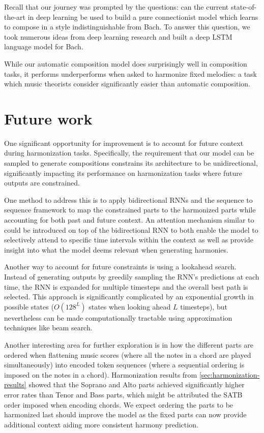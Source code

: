 Recall that our journey was prompted by the questions: can the current
state-of-the-art in deep learning be used to build a pure connectionist
model which learns to compose in a style indistinguishable from Bach. To
answer this question, we took numerous ideas from deep learning research
and built a deep LSTM language model for Bach.

While our automatic composition model does surprisingly well in composition
tasks, it performs underperforms when asked to harmonize fixed melodies: a task
which music theorists consider significantly easier than automatic composition.

\section{Future work}

One significant opportunity for improvement is to account for future
context during harmonization tasks. Specifically, the requirement that
our model can be sampled to generate compositions constrains its
architecture to be unidirectional, significantly impacting its
performance on harmonization tasks where future outputs are constrained.

One method to address this is to apply bidirectional
RNNs\citep{Graves2005} and the sequence to sequence
framework\citep{sutskever2014sequence} to map the constrained parts to
the harmonized parts while accounting for both past and future context.
An attention mechanism similar to \citet{Bahdanau2015} could be
introduced on top of the bidirectional RNN to both enable the model to
selectively attend to specific time intervals within the context as well
as provide insight into what the model deems relevant when generating
harmonies.

Another way to account for future constraints is using a lookahead
search. Instead of generating outputs by greedily sampling the RNN's
predictions at each time, the RNN is expanded for multiple timesteps and
the overall best path is selected. This approach is significantly
complicated by an exponential growth in possible states ($O(128^L)$
states when looking ahead $L$ timesteps), but nevertheless can be made
computationally tractable using approximation techniques like
beam search\citep{norvig1992paradigms}.

Another interesting area for further exploration is in how the different parts
are ordered when flattening music scores (where all the notes in a chord are
played simultaneously) into encoded token sequences (where a sequential
ordering is imposed on the notes in a chord). Harmonization results from
\vref{sec:harmonization-results} showed that the Soprano and Alto parts
achieved significantly higher error rates than Tenor and Bass parts, which
might be attributed the SATB order imposed when encoding chords. We expect
ordering the parts to be harmonized last should improve the model as the fixed
parts can now provide additional context aiding more consistent harmony
prediction.

